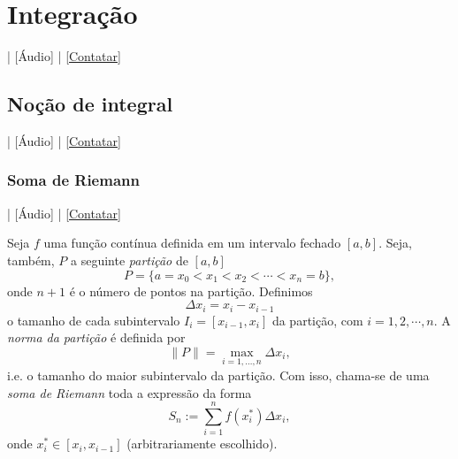 
\chapter{Integração}\label{cap_int}
\thispagestyle{fancy}

\begin{flushright}
  [Vídeo] | [Áudio] | \href{https://phkonzen.github.io/notas/contato.html}{[Contatar]}
\end{flushright}

\section{Noção de integral}\label{cap_int_sec_nocaoint}

\begin{flushright}
  [Vídeo] | [Áudio] | \href{https://phkonzen.github.io/notas/contato.html}{[Contatar]}
\end{flushright}

\subsection{Soma de Riemann}

\begin{flushright}
  [Vídeo] | [Áudio] | \href{https://phkonzen.github.io/notas/contato.html}{[Contatar]}
\end{flushright}

Seja $f$ uma função contínua definida em um intervalo fechado $[a, b]$. Seja, também, $P$ a seguinte \emph{partição} de $[a, b]$
\begin{equation}
  P = \{a=x_0<x_1<x_2<\cdots<x_n=b\},
\end{equation}
onde $n+1$ é o número de pontos na partição. Definimos
\begin{equation}
  \Delta x_i = x_{i} - x_{i-1}
\end{equation}
o tamanho de cada subintervalo $I_{i} = [x_{i-1}, x_{i}]$ da partição, com $i = 1, 2, \cdots, n$. A \emph{norma da partição} é definida por
\begin{equation}
  \|P\| = \max_{i=1, \dotsc, n} \Delta x_i,
\end{equation}
i.e. o tamanho do maior subintervalo da partição. Com isso, chama-se de uma \emph{soma de Riemann} toda a expressão da forma
\begin{equation}
  S_n := \sum_{i=1}^n f(x_i^*)\Delta x_i,
\end{equation}
onde $x_i^*\in [x_i, x_{i-1}]$ (arbitrariamente escolhido).

